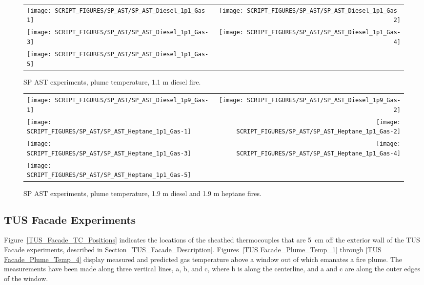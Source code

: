 \begin{figure}[!h]
\begin{tabular*}{\textwidth}{l@{\extracolsep{\fill}}r}
\texttt{[image: SCRIPT\_FIGURES/SP\_AST/SP\_AST\_Diesel\_1p1\_Gas-1]}   &  \texttt{[image: SCRIPT\_FIGURES/SP\_AST/SP\_AST\_Diesel\_1p1\_Gas-2]}    \\
\texttt{[image: SCRIPT\_FIGURES/SP\_AST/SP\_AST\_Diesel\_1p1\_Gas-3]}   &  \texttt{[image: SCRIPT\_FIGURES/SP\_AST/SP\_AST\_Diesel\_1p1\_Gas-4]}     \\
\texttt{[image: SCRIPT\_FIGURES/SP\_AST/SP\_AST\_Diesel\_1p1\_Gas-5]}   &
\end{tabular*}
\caption[SP AST experiments, plume temperature, 1.1 m diesel fire]
{SP AST experiments, plume temperature, 1.1 m diesel fire.}
\label{SP_Diesel_1p1_Gas}
\end{figure}

\newpage

\begin{figure}[p]
\begin{tabular*}{\textwidth}{l@{\extracolsep{\fill}}r}
\texttt{[image: SCRIPT\_FIGURES/SP\_AST/SP\_AST\_Diesel\_1p9\_Gas-1]}   &  \texttt{[image: SCRIPT\_FIGURES/SP\_AST/SP\_AST\_Diesel\_1p9\_Gas-2]}    \\
\texttt{[image: SCRIPT\_FIGURES/SP\_AST/SP\_AST\_Heptane\_1p1\_Gas-1]}  &  \texttt{[image: SCRIPT\_FIGURES/SP\_AST/SP\_AST\_Heptane\_1p1\_Gas-2]}    \\
\texttt{[image: SCRIPT\_FIGURES/SP\_AST/SP\_AST\_Heptane\_1p1\_Gas-3]}  &  \texttt{[image: SCRIPT\_FIGURES/SP\_AST/SP\_AST\_Heptane\_1p1\_Gas-4]}     \\
\texttt{[image: SCRIPT\_FIGURES/SP\_AST/SP\_AST\_Heptane\_1p1\_Gas-5]}  &
\end{tabular*}
\caption[SP AST experiments, plume temperature, 1.9 m diesel and 1.1 m heptane fires]
{SP AST experiments, plume temperature, 1.9 m diesel and 1.9 m heptane fires.}
\label{SP_Diesel_1p9_Gas}
\end{figure}

\clearpage


\subsection{TUS Facade Experiments}
\label{TUS_Facade_Plume_Temperature}

Figure~\ref{TUS_Facade_TC_Positions} indicates the locations of the sheathed thermocouples that are 5~cm off the exterior wall of the TUS Facade experiments, described in Section~\ref{TUS_Facade_Description}. Figures~\ref{TUS Facade_Plume_Temp_1} through \ref{TUS Facade_Plume_Temp_4} display measured and predicted gas temperature above a window out of which emanates a fire plume. The measurements have been made along three vertical lines, a, b, and c, where b is along the centerline, and a and c are along the outer edges of the window.

